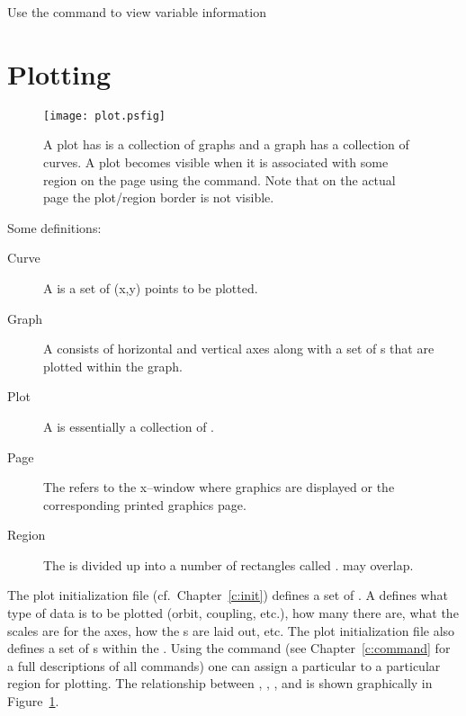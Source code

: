 Use the  command to view variable information

\vfill
\break
\section{Plotting}

\begin{figure}
  \centering
  \texttt{[image: plot.psfig]}
  \caption{A plot has is a collection of graphs and a graph has a 
collection of curves. A plot becomes visible when it is associated
with some region on the page using the  command. Note that
on the actual page the plot/region border is not visible.}
  \label{f:plot}
\end{figure}

Some definitions:
  \vspace*{-3ex}
\begin{description}
\item[Curve] \Newline
A  is a set of (x,y) points to be plotted.
\item[Graph] \Newline
A  consists of horizontal and vertical axes along with a set
of s that are plotted within the graph. 
\item[Plot] \Newline
A  is essentially a collection of .
\item[Page] \Newline
The  refers to the x--window where graphics are displayed or the 
corresponding printed graphics page.
\item[Region] \Newline
The  is divided up into a number of rectangles called
.  may overlap.
\end{description}

The plot initialization file (cf.~Chapter~\ref{c:init}) defines a set
of . A  defines what type of data is
to be plotted (orbit, coupling, etc.), how many  there are,
what the scales are for the  axes, how the s are
laid out, etc.  The plot initialization file also defines a set of
s within the .  Using the  command  
(see Chapter~\ref{c:command} for a full descriptions of all commands) one
can assign a particular  to a particular region for plotting.
The relationship between , , , and
 is shown graphically in Figure~\ref{f:plot}.

